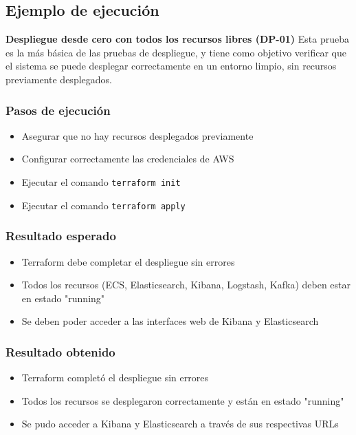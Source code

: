 \newpage{}
\subsection{Ejemplo de ejecución}
\textbf{Despliegue desde cero con todos los recursos libres (DP-01)}
Esta prueba es la más básica de las pruebas de despliegue, y tiene como
objetivo verificar que el sistema se puede desplegar correctamente en un
entorno limpio, sin recursos previamente desplegados.

\subsubsection{Pasos de ejecución}
\begin{itemize}
    \item Asegurar que no hay recursos desplegados previamente
    \item Configurar correctamente las credenciales de AWS
    \item Ejecutar el comando \texttt{terraform init}
    \item Ejecutar el comando \texttt{terraform apply}
\end{itemize}

\subsubsection{Resultado esperado}
\begin{itemize}
    \item Terraform debe completar el despliegue sin errores
    \item Todos los recursos (ECS, Elasticsearch, Kibana, Logstash, Kafka)
    deben estar en estado "running"
    \item Se deben poder acceder a las interfaces web de Kibana y Elasticsearch
\end{itemize}

\subsubsection{Resultado obtenido}
\begin{itemize}
    \item Terraform completó el despliegue sin errores
    \item Todos los recursos se desplegaron correctamente y están en estado
    "running"
    \item Se pudo acceder a Kibana y Elasticsearch a través de sus respectivas
    URLs
\end{itemize}

